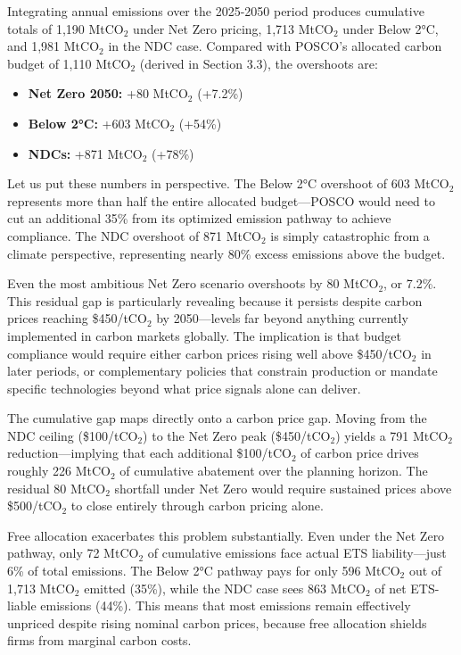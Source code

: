 \documentclass[preprint,1p,authoryear]{elsarticle}
\begin{document}
Integrating annual emissions over the 2025-2050 period produces cumulative totals of 1,190 MtCO$_2$ under Net Zero pricing, 1,713 MtCO$_2$ under Below 2°C, and 1,981 MtCO$_2$ in the NDC case. Compared with POSCO's allocated carbon budget of 1,110 MtCO$_2$ (derived in Section 3.3), the overshoots are:

\begin{itemize}[leftmargin=*]
  \item \textbf{Net Zero 2050:} +80 MtCO$_2$ (+7.2\%)
  \item \textbf{Below 2°C:} +603 MtCO$_2$ (+54\%)
  \item \textbf{NDCs:} +871 MtCO$_2$ (+78\%)
\end{itemize}

Let us put these numbers in perspective. The Below 2°C overshoot of 603 MtCO$_2$ represents more than half the entire allocated budget—POSCO would need to cut an additional 35\% from its optimized emission pathway to achieve compliance. The NDC overshoot of 871 MtCO$_2$ is simply catastrophic from a climate perspective, representing nearly 80\% excess emissions above the budget.

Even the most ambitious Net Zero scenario overshoots by 80 MtCO$_2$, or 7.2\%. This residual gap is particularly revealing because it persists despite carbon prices reaching \$450/tCO$_2$ by 2050—levels far beyond anything currently implemented in carbon markets globally. The implication is that budget compliance would require either carbon prices rising well above \$450/tCO$_2$ in later periods, or complementary policies that constrain production or mandate specific technologies beyond what price signals alone can deliver.

The cumulative gap maps directly onto a carbon price gap. Moving from the NDC ceiling (\$100/tCO$_2$) to the Net Zero peak (\$450/tCO$_2$) yields a 791 MtCO$_2$ reduction—implying that each additional \$100/tCO$_2$ of carbon price drives roughly 226 MtCO$_2$ of cumulative abatement over the planning horizon. The residual 80 MtCO$_2$ shortfall under Net Zero would require sustained prices above \$500/tCO$_2$ to close entirely through carbon pricing alone.

Free allocation exacerbates this problem substantially. Even under the Net Zero pathway, only 72 MtCO$_2$ of cumulative emissions face actual ETS liability—just 6\% of total emissions. The Below 2°C pathway pays for only 596 MtCO$_2$ out of 1,713 MtCO$_2$ emitted (35\%), while the NDC case sees 863 MtCO$_2$ of net ETS-liable emissions (44\%). This means that most emissions remain effectively unpriced despite rising nominal carbon prices, because free allocation shields firms from marginal carbon costs.
\end{document}
